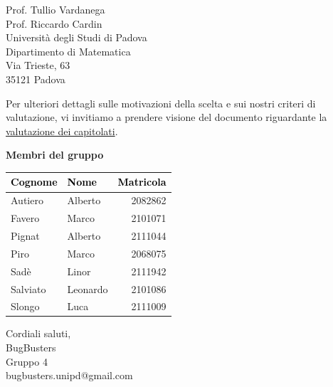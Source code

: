 \documentclass[a4paper,11pt]{letter}
\makeatletter
\newcommand{\GruppoFirma}{BugBusters\\Gruppo 4\\bugbusters.unipd@gmail.com}
\makeatother
\begin{document}
\begin{letter}{Prof. Tullio Vardanega\\Prof. Riccardo Cardin\\Universit\`a degli Studi di Padova\\Dipartimento di Matematica\\Via Trieste, 63\\35121 Padova}
\vspace{0.8em}

Per ulteriori dettagli sulle motivazioni della scelta e sui nostri criteri di valutazione, 
vi invitiamo a prendere visione del documento riguardante la \href{https://bugbustersunipd.github.io/BugBusterSite/assets/docs/SCELTA_CAPITOLATO/Resoconto_capitolati.pdf}{valutazione dei capitolati}.


\vspace{1em}

	\textbf{Membri del gruppo}
\begin{center}
\setlength{\arrayrulewidth}{0.8pt}
\begin{tabular}{|l|l|r|}
\hline
\rowcolor{primarycolor!20}
	\textcolor{black}{\textbf{Cognome}} & \textcolor{black}{\textbf{Nome}} & \textcolor{black}{\textbf{Matricola}} \\
\hline
Autiero & Alberto & 2082862 \\
\hline
Favero & Marco & 2101071 \\
\hline
Pignat & Alberto & 2111044 \\
\hline
Piro & Marco & 2068075 \\
\hline
Sad\`e & Linor & 2111942 \\
\hline
Salviato & Leonardo & 2101086 \\
\hline
Slongo & Luca & 2111009 \\
\hline
\end{tabular}
\end{center}


\vspace{1.2em}

\closing{Cordiali saluti, \vspace{1.2em} \\ \GruppoFirma}

\end{letter}
\end{document}
